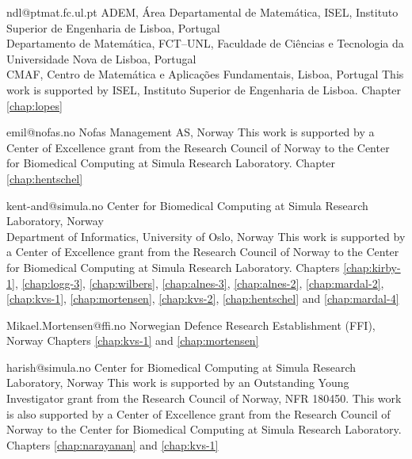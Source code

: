              {ndl@ptmat.fc.ul.pt}
             {ADEM, \'{A}rea Departamental de Matem\'{a}tica,
              ISEL, Instituto Superior de Engenharia de Lisboa, Portugal \\
              Departamento de Matem\'{a}tica, FCT--UNL,
              Faculdade de Ci\^{e}ncias e Tecnologia da Universidade Nova de Lisboa, Portugal \\
              CMAF, Centro de Matem\'{a}tica e Aplica\c{c}\~{o}es Fundamentais, Lisboa, Portugal}
              {This work is supported by ISEL, Instituto Superior de Engenharia de Lisboa.}
              {Chapter \ref{chap:lopes}}

             {emil@nofas.no}
             {Nofas Management AS, Norway}
             {This work is supported by a Center of Excellence
              grant from the Research Council of Norway to the Center
              for Biomedical Computing at Simula Research
              Laboratory.}
             {Chapter \ref{chap:hentschel}}

             {kent-and@simula.no}
             {Center for Biomedical Computing at Simula Research Laboratory, Norway \\
              Department of Informatics, University of Oslo, Norway}
             {This work is supported by a Center of Excellence grant
              from the Research Council of Norway to the Center for
              Biomedical Computing at Simula Research Laboratory.}
             {Chapters
              \ref{chap:kirby-1}, \ref{chap:logg-3}, \ref{chap:wilbers},
              \ref{chap:alnes-3}, \ref{chap:alnes-2}, \ref{chap:mardal-2},
              \ref{chap:kvs-1}, \ref{chap:mortensen}, \ref{chap:kvs-2},
              \ref{chap:hentschel} and \ref{chap:mardal-4}}

             {Mikael.Mortensen@ffi.no}
             {Norwegian Defence Research Establishment (FFI), Norway}
             {}
             {Chapters \ref{chap:kvs-1} and \ref{chap:mortensen}}

             {harish@simula.no}
             {Center for Biomedical Computing at Simula Research Laboratory, Norway}
             {This work is supported by an Outstanding Young
              Investigator grant from the Research Council of Norway,
              NFR 180450. This work is also supported by a Center of
              Excellence grant from the Research Council of Norway to
              the Center for Biomedical Computing at Simula Research
              Laboratory.}
             {Chapters \ref{chap:narayanan} and \ref{chap:kvs-1}}

